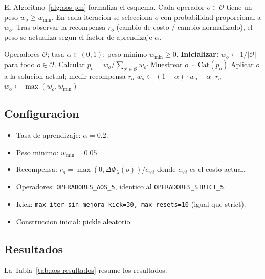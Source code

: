 El Algoritmo~\ref{alg:aos-pm} formaliza el esquema. Cada operador
$o \in \mathcal{O}$ tiene un peso $w_o \ge w_{\min}$. En cada iteracion
se selecciona $o$ con probabilidad proporcional a $w_o$. Tras observar
la recompensa $r_o$ (cambio de costo / cambio normalizado), el peso se
actualiza segun el factor de aprendizaje $\alpha$.

\begin{algorithm}[h]
\caption{AOS Probability Matching.}
\label{alg:aos-pm}
\begin{algorithmic}[1]
\Require Operadores $\mathcal{O}$; tasa $\alpha \in (0,1)$; peso minimo $w_{\min} \ge 0$.
\State \textbf{Inicializar:} $w_o \gets 1 / |\mathcal{O}|$ para todo $o \in \mathcal{O}$.
  \State Calcular $p_o = w_o / \sum_{o' \in \mathcal{O}} w_{o'}$
  \State Muestrear $o \sim \text{Cat}(p_o)$
  \State Aplicar $o$ a la solucion actual; medir recompensa $r_o$
  \State $w_o \gets (1-\alpha) \cdot w_o + \alpha \cdot r_o$
  \State $w_o \gets \max(w_o, w_{\min})$ 
\EndFor
\end{algorithmic}
\end{algorithm}

\subsection{Configuracion}

\begin{itemize}
\item Tasa de aprendizaje: $\alpha = 0.2$.
\item Peso minimo: $w_{\min} = 0.05$.
\item Recompensa: $r_o = \max(0, \Delta\Phi_\lambda(o)) / c_{\text{ref}}$
  donde $c_{\text{ref}}$ es el costo actual.
\item Operadores: \texttt{OPERADORES\_AOS\_5}, identico al
  \texttt{OPERADORES\_STRICT\_5}.
\item Kick: \texttt{max\_iter\_sin\_mejora\_kick=30, max\_resets=10}
  (igual que strict).
\item Construccion inicial: pickle aleatorio.
\end{itemize}

\subsection{Resultados}

La Tabla~\ref{tab:aos-resultados} resume los resultados.

